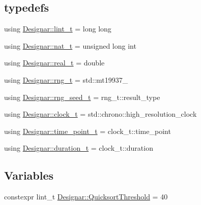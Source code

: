 \subsection*{typedefs}
\begin{DoxyCompactItemize}
\item 
using \hyperlink{namespace_designar_a9d113d66a39e82b73727c72cd3a52f73}{Designar\+::lint\+\_\+t} = long long
\item 
using \hyperlink{namespace_designar_aa72662848b9f4815e7bf31a7cf3e33d1}{Designar\+::nat\+\_\+t} = unsigned long int
\item 
using \hyperlink{namespace_designar_aca2c32af26808dbec1f3a3071fad25ce}{Designar\+::real\+\_\+t} = double
\item 
using \hyperlink{namespace_designar_a9ca84e2ff5daa62ebc4dab52f3a6c855}{Designar\+::rng\+\_\+t} = std\+::mt19937\+\_
\item 
using \hyperlink{namespace_designar_ad621b5646d45288c5d6a1e1dfe7531a8}{Designar\+::rng\+\_\+seed\+\_\+t} = rng\+\_\+t\+::result\+\_\+type
\item 
using \hyperlink{namespace_designar_a4892484bd553fb9ec4b8a559a83a415c}{Designar\+::clock\+\_\+t} = std\+::chrono\+::high\+\_\+resolution\+\_\+clock
\item 
using \hyperlink{namespace_designar_a0edbd598eadb672df2c70e5af4dfccee}{Designar\+::time\+\_\+point\+\_\+t} = clock\+\_\+t\+::time\+\_\+point
\item 
using \hyperlink{namespace_designar_a585b685c3d4f0d52edf0a6412caee626}{Designar\+::duration\+\_\+t} = clock\+\_\+t\+::duration
\end{DoxyCompactItemize}
\subsection*{Variables}
\begin{DoxyCompactItemize}
\item 
constexpr lint\+\_\+t \hyperlink{namespace_designar_a62c201985e06bb7419a888d5d2b7bde8}{Designar\+::\+Quicksort\+Threshold} = 40
\end{DoxyCompactItemize}
